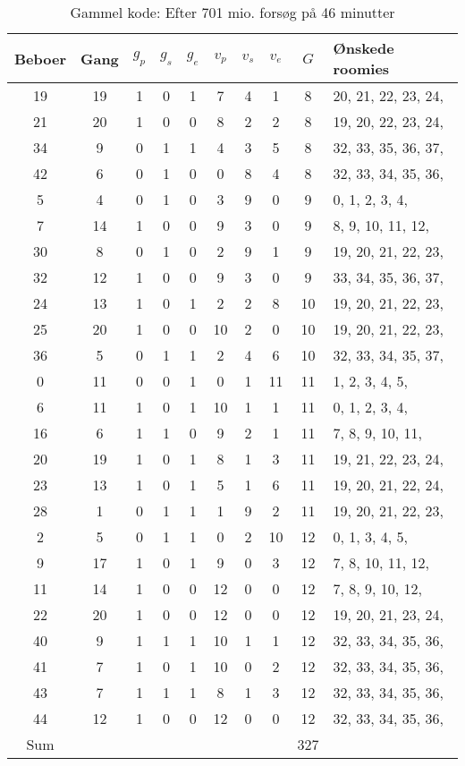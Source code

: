 \documentclass[article,oneside,11pt,a4paper]{memoir}
\newenvironment{assignment}[1]{
\begin{table}[h]
\caption{#1}
\footnotesize
\begin{center}
\begin{tabular}{cccccccccl}
\toprule
Beboer & Gang & $g_p$ & $g_s$ & $g_e$ & $v_p$ & $v_s$ & $v_e$ & $G$ & Ønskede roomies \\ \midrule
}{
\bottomrule
\end{tabular}
\end{center}
\end{table}

}
\begin{document}
\begin{assignment}{Gammel kode: Efter 701 mio. forsøg på 46 minutter}
    19 &   19 &   1 &   0 &   1 &   7 &   4 &   1 &  8 &  20, 21, 22, 23, 24, \\
    21 &   20 &   1 &   0 &   0 &   8 &   2 &   2 &  8 &  19, 20, 22, 23, 24, \\
    34 &    9 &   0 &   1 &   1 &   4 &   3 &   5 &  8 &  32, 33, 35, 36, 37, \\
    42 &    6 &   0 &   1 &   0 &   0 &   8 &   4 &  8 &  32, 33, 34, 35, 36, \\
     5 &    4 &   0 &   1 &   0 &   3 &   9 &   0 &  9 &   0,  1,  2,  3,  4, \\
     7 &   14 &   1 &   0 &   0 &   9 &   3 &   0 &  9 &   8,  9, 10, 11, 12, \\
    30 &    8 &   0 &   1 &   0 &   2 &   9 &   1 &  9 &  19, 20, 21, 22, 23, \\
    32 &   12 &   1 &   0 &   0 &   9 &   3 &   0 &  9 &  33, 34, 35, 36, 37, \\
    24 &   13 &   1 &   0 &   1 &   2 &   2 &   8 & 10 &  19, 20, 21, 22, 23, \\
    25 &   20 &   1 &   0 &   0 &  10 &   2 &   0 & 10 &  19, 20, 21, 22, 23, \\
    36 &    5 &   0 &   1 &   1 &   2 &   4 &   6 & 10 &  32, 33, 34, 35, 37, \\
     0 &   11 &   0 &   0 &   1 &   0 &   1 &  11 & 11 &   1,  2,  3,  4,  5, \\
     6 &   11 &   1 &   0 &   1 &  10 &   1 &   1 & 11 &   0,  1,  2,  3,  4, \\
    16 &    6 &   1 &   1 &   0 &   9 &   2 &   1 & 11 &   7,  8,  9, 10, 11, \\
    20 &   19 &   1 &   0 &   1 &   8 &   1 &   3 & 11 &  19, 21, 22, 23, 24, \\
    23 &   13 &   1 &   0 &   1 &   5 &   1 &   6 & 11 &  19, 20, 21, 22, 24, \\
    28 &    1 &   0 &   1 &   1 &   1 &   9 &   2 & 11 &  19, 20, 21, 22, 23, \\
     2 &    5 &   0 &   1 &   1 &   0 &   2 &  10 & 12 &   0,  1,  3,  4,  5, \\
     9 &   17 &   1 &   0 &   1 &   9 &   0 &   3 & 12 &   7,  8, 10, 11, 12, \\
    11 &   14 &   1 &   0 &   0 &  12 &   0 &   0 & 12 &   7,  8,  9, 10, 12, \\
    22 &   20 &   1 &   0 &   0 &  12 &   0 &   0 & 12 &  19, 20, 21, 23, 24, \\
    40 &    9 &   1 &   1 &   1 &  10 &   1 &   1 & 12 &  32, 33, 34, 35, 36, \\
    41 &    7 &   1 &   0 &   1 &  10 &   0 &   2 & 12 &  32, 33, 34, 35, 36, \\
    43 &    7 &   1 &   1 &   1 &   8 &   1 &   3 & 12 &  32, 33, 34, 35, 36, \\
    44 &   12 &   1 &   0 &   0 &  12 &   0 &   0 & 12 &  32, 33, 34, 35, 36, \\
Sum &&&&&&&& 327 & \\
\end{assignment}
\end{document}

